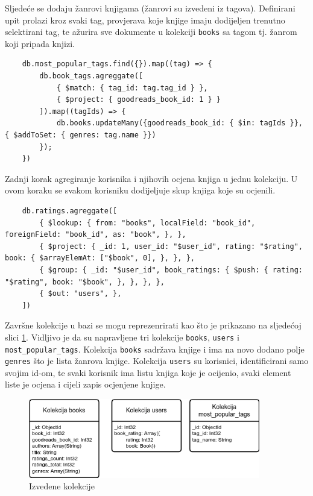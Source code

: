 \documentclass[]{foi}
\begin{document}
Sljedeće se dodaju žanrovi knjigama (žanrovi su izvedeni iz tagova). Definirani upit prolazi kroz svaki tag,
provjerava koje knjige imaju dodijeljen trenutno selektirani tag, te ažurira sve dokumente u kolekciji \texttt{books}
sa tagom tj. žanrom koji pripada knjizi.

\begin{verbatim}
    db.most_popular_tags.find({}).map((tag) => {
        db.book_tags.agreggate([
            { $match: { tag_id: tag.tag_id } },
            { $project: { goodreads_book_id: 1 } }
        ]).map((tagIds) => {
            db.books.updateMany({goodreads_book_id: { $in: tagIds }}, { $addToSet: { genres: tag.name }})
        });
    })
\end{verbatim}
\label{lst:zanrovi}

Zadnji korak agregiranje korisnika i njihovih ocjena knjiga u jednu kolekciju. U ovom koraku se svakom korisniku
dodijeljuje skup knjiga koje su ocjenili.

\begin{verbatim}
    db.ratings.agreggate([
        { $lookup: { from: "books", localField: "book_id", foreignField: "book_id", as: "book", }, },
        { $project: { _id: 1, user_id: "$user_id", rating: "$rating", book: { $arrayElemAt: ["$book", 0], }, }, },
        { $group: { _id: "$user_id", book_ratings: { $push: { rating: "$rating", book: "$book", }, }, }, },
        { $out: "users", },
    ])
\end{verbatim}
\label{lst:korisnici}

Završne kolekcije u bazi se mogu reprezenrirati kao što je prikazano na sljedećoj slici \ref{fig:izvedene_kolekcije}.
Vidljivo je da su napravljene tri kolekcije \texttt{books}, \texttt{users} i \texttt{most\_popular\_tags}.
Kolekcija \texttt{books} sadržava knjige i ima na novo dodano polje \texttt{genres} što je lista žanrova knjige.
Kolekcija \texttt{users} su korisnici, identificirani samo svojim id-om, te svaki korisnik ima listu knjiga koje je
ocijenio, svaki element liste je ocjena i cijeli zapis ocjenjene knjige.

\begin{figure}[h!]
	\centering
	\includegraphics[width=0.9\textwidth]{slike/kolekcije.png}
	\caption{Izvedene kolekcije}
	\label{fig:izvedene_kolekcije}
\end{figure}
\end{document}
